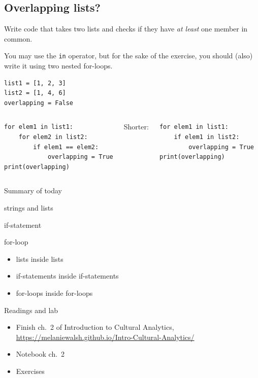 \documentclass[aspectratio=169,usenames,dvipsnames]{beamer}
\begin{document}
\subsection{Overlapping lists?}
\begin{frame}[fragile]
    Write code that takes two lists and checks if they have \emph{at least} one
    member in common.

    \vspace{1em}
    You may use the \lstinline{in} operator, but for the sake of the
    exercise, you should (also) write it using two nested for-loops.
\begin{lstlisting}
list1 = [1, 2, 3]
list2 = [1, 4, 6]
overlapping = False
\end{lstlisting}
\pause
\begin{columns}[T]
\begin{lstlisting}
for elem1 in list1:
    for elem2 in list2:
        if elem1 == elem2:
            overlapping = True
print(overlapping)
\end{lstlisting}
\pause
{}
Shorter:
\begin{lstlisting}
for elem1 in list1:
    if elem1 in list2:
        overlapping = True
print(overlapping)
\end{lstlisting}
\end{columns}
\end{frame}

\begin{frame}{Summary of today}
    \begin{description}
        \item[Sequence types] strings and lists
        \item[Conditions] if-statement
        \item[Repetition] for-loop
        \item[Nesting]
            \begin{itemize}
                \item lists inside lists
                \item if-statements inside if-statements
                \item for-loops inside for-loops
            \end{itemize}
    \end{description}
\end{frame}


\begin{frame}{Readings and lab}
    \begin{itemize}
        \item Finish ch.~2 of Introduction to Cultural Analytics,\\
            \url{https://melaniewalsh.github.io/Intro-Cultural-Analytics/}
        \item Notebook ch.\ 2
        \item Exercises
    \end{itemize}
\end{frame}
\end{document}

